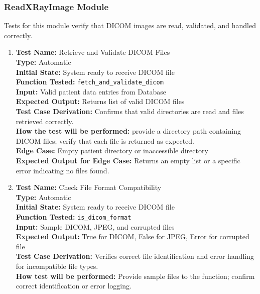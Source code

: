 \documentclass[12pt, titlepage]{article}
\begin{document}
\subsubsection{ReadXRayImage Module}
Tests for this module verify that DICOM images are read, validated, and handled correctly.
\begin{enumerate}
  \item \textbf{Test Name:} Retrieve and Validate DICOM Files\\
    \textbf{Type:} Automatic\\
    \textbf{Initial State:} System ready to receive DICOM file\\
    \textbf{Function Tested:} \verb|fetch_and_validate_dicom|\\
    \textbf{Input:} Valid patient data entries from Database\\
    \textbf{Expected Output:} Returns list of valid DICOM files\\
    \textbf{Test Case Derivation:} Confirms that valid directories are read and files retrieved correctly.\\
    \textbf{How the test will be performed:} provide a directory path containing DICOM files; verify that each file is returned as expected.\\
    \textbf{Edge Case:} Empty patient directory or inaccessible directory\\
    \textbf{Expected Output for Edge Case:} Returns an empty list or a specific error indicating no files found.

  \item \textbf{Test Name:}  Check File Format Compatibility\\
    \textbf{Type:}  Automatic\\
    \textbf{Initial State:}  System ready to receive DICOM file\\
    \textbf{Function Tested:}  \verb|is_dicom_format|\\
    \textbf{Input:}  Sample DICOM, JPEG, and corrupted files\\
    \textbf{Expected Output:}  True for DICOM, False for JPEG, Error for corrupted file\\
    \textbf{Test Case Derivation:}  Verifies correct file identification and error handling for incompatible file types.\\
    \textbf{How test will be performed:}  Provide sample files to the function; confirm correct identification or error logging.\\


\end{enumerate}
\end{document}
